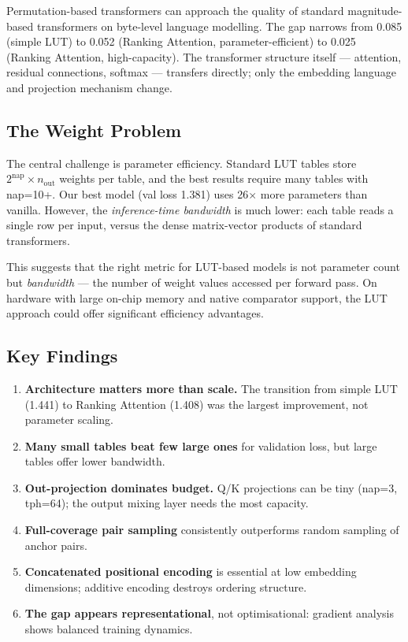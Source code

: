\documentclass[11pt]{article}
\begin{document}
Permutation-based transformers can approach the quality of standard magnitude-based transformers on byte-level language modelling.
The gap narrows from 0.085 (simple LUT) to 0.052 (Ranking Attention, parameter-efficient) to 0.025 (Ranking Attention, high-capacity).
The transformer structure itself --- attention, residual connections, softmax --- transfers directly; only the embedding language and projection mechanism change.

\subsection{The Weight Problem}

The central challenge is parameter efficiency.
Standard LUT tables store $2^{\mathrm{nap}} \times n_\mathrm{out}$ weights per table, and the best results require many tables with nap=10+.
Our best model (val loss 1.381) uses 26$\times$ more parameters than vanilla.
However, the \emph{inference-time bandwidth} is much lower: each table reads a single row per input, versus the dense matrix-vector products of standard transformers.

This suggests that the right metric for LUT-based models is not parameter count but \emph{bandwidth} --- the number of weight values accessed per forward pass.
On hardware with large on-chip memory and native comparator support, the LUT approach could offer significant efficiency advantages.

\subsection{Key Findings}

\begin{enumerate}
    \item \textbf{Architecture matters more than scale.} The transition from simple LUT (1.441) to Ranking Attention (1.408) was the largest improvement, not parameter scaling.
    \item \textbf{Many small tables beat few large ones} for validation loss, but large tables offer lower bandwidth.
    \item \textbf{Out-projection dominates budget.} Q/K projections can be tiny (nap=3, tph=64); the output mixing layer needs the most capacity.
    \item \textbf{Full-coverage pair sampling} consistently outperforms random sampling of anchor pairs.
    \item \textbf{Concatenated positional encoding} is essential at low embedding dimensions; additive encoding destroys ordering structure.
    \item \textbf{The gap appears representational}, not optimisational: gradient analysis shows balanced training dynamics.
\end{enumerate}
\end{document}
